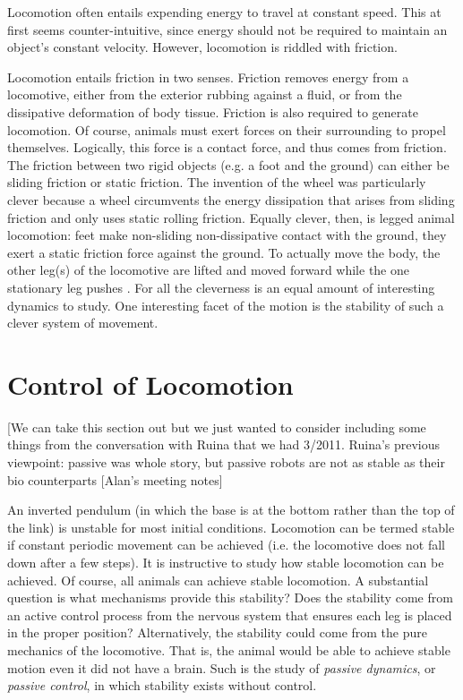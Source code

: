 Locomotion often entails expending energy to travel at constant speed. This at first seems counter-intuitive, since energy should not be required to maintain an object's constant velocity. However, locomotion is riddled with friction.

Locomotion entails friction in two senses. Friction removes energy from a locomotive, either from the exterior rubbing against a fluid, or from the dissipative deformation of body tissue. Friction is also required to generate locomotion. Of course, animals must exert forces on their surrounding to propel themselves. Logically, this force is a contact force, and thus comes from friction. The friction between two rigid objects (e.g. a foot and the ground) can either be sliding friction or static friction. The invention of the wheel was particularly clever because a wheel circumvents the energy dissipation that arises from sliding friction and only uses static rolling friction. Equally clever, then, is legged animal locomotion: feet make non-sliding non-dissipative contact with the ground, they exert a static friction force against the ground. To actually move the body, the other leg(s) of the locomotive are lifted and moved forward while the one stationary leg pushes \cite{radhakrishnan98}. For all the cleverness is an equal amount of interesting dynamics to study. One interesting facet of the motion is the stability of such a clever system of movement.

\section{Control of Locomotion}
[We can take this section out but we just wanted to consider including some things from the conversation with Ruina that we had 3/2011. Ruina's previous viewpoint: passive was whole story, but passive robots are not as stable as their bio counterparts [Alan's meeting notes]

An inverted pendulum (in which the base is at the bottom rather than the top of the link) is unstable for most initial conditions. Locomotion can be termed stable if constant periodic movement can be achieved (i.e. the locomotive does not fall down after a few steps). It is instructive to study how stable locomotion can be achieved. Of course, all animals can achieve stable locomotion. A substantial question is what mechanisms provide this stability? Does the stability come from an active control process from the nervous system that ensures each leg is placed in the proper position? Alternatively, the stability could come from the pure mechanics of the locomotive. That is, the animal would be able to achieve stable motion even it did not have a brain. Such is the study of \emph{passive dynamics}, or \emph{passive control}, in which stability exists without control.

